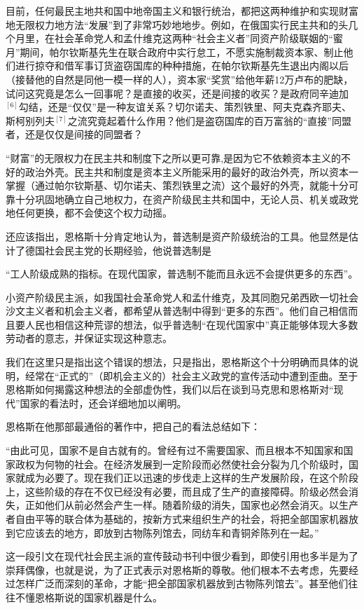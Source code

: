 \leftskip=0mm
\normalsize
\pskip

目前，任何最民主地共和国中地帝国主义和银行统治，都把这两种维护和实现财富地无限权力地方法“发展”到了非常巧妙地地步。例如，在俄国实行民主共和的头几个月里，在社会革命党人和孟什维克这两种“社会主义者”同资产阶级联姻的“蜜月”期间，帕尔钦斯基先生在联合政府中实行怠工，不愿实施制裁资本家、制止他们进行掠夺和借军事订货盗窃国库的种种措施，在帕尔钦斯基先生退出内阁以后（接替他的自然是同他一模一样的人），资本家“奖赏”给他年薪12万卢布的肥缺，试问这究竟是怎么一回事呢？是直接的收买，还是间接的收买？是政府同辛迪加$^{[6]}$勾结，还是“仅仅”是一种友谊关系？切尔诺夫、策烈铁里、阿夫克森齐耶夫、斯柯别列夫$^{[7]}$之流究竟起着什么作用？他们是盗窃国库的百万富翁的“直接”同盟者，还是仅仅是间接的同盟者？

“财富”的无限权力在民主共和制度下之所以更{\kaishu 可靠},是因为它不依赖资本主义的不好的政治外壳。民主共和制度是资本主义所能采用的最好的政治外壳，所以资本一掌握（通过帕尔钦斯基、切尔诺夫、策烈铁里之流）这个最好的外壳，就能十分可靠十分巩固地确立自己地权力，在资产阶级民主共和国中，无论人员、机关或政党地{\kaishu 任何}更换，都不会使这个权力动摇。

还应该指出，恩格斯十分肯定地认为，普选制是资产阶级统治的工具。他显然是估计了德国社会民主党的长期经验，他说普选制是
\pskip
\leftskip=10mm
\small

“工人阶级成熟的指标。在现代国家，普选制不能而且永远不会提供更多的东西”。

\leftskip=0mm
\normalsize
\pskip

小资产阶级民主派，如我国社会革命党人和孟什维克，及其同胞兄弟西欧一切社会沙文主义者和机会主义者，都希望从普选制中得到“更多的东西”。他们自己相信而且要人民也相信这种荒谬的想法，似乎普选制“在{\kaishu 现代}国家中”真正能够体现大多数劳动者的意志，并保证实现这种意志。

我们在这里只是指出这个错误的想法，只是指出，恩格斯这个十分明确而具体的说明，经常在“正式的”（即机会主义的）社会主义政党的宣传活动中遭到歪曲。至于恩格斯如何揭露这种想法的全部虚伪性，我们以后在谈到马克思和恩格斯对“{\kaishu 现代}”国家的看法时，还会详细地加以阐明。

恩格斯在他那部最通俗的著作中，把自己的看法总结如下：
\pskip
\leftskip=10mm
\small

“由此可见，国家不是自古就有的。曾经有过不需要国家、而且根本不知国家和国家政权为何物的社会。在经济发展到一定阶段而必然使社会分裂为几个阶级时，国家就成为必要了。现在我们正以迅速的步伐走上这样的生产发展阶段，在这个阶段上，这些阶级的存在不仅已经没有必要，而且成了生产的直接障碍。阶级必然会消失，正如他们从前必然会产生一样。随着阶级的消失，国家也必然会消灭。以生产者自由平等的联合体为基础的，按新方式来组织生产的社会，将把全部国家机器放到它应该去的地方，即放到古物陈列馆去，同纺车和青铜斧陈列在一起。”

\leftskip=0mm
\normalsize
\pskip

这一段引文在现代社会民主派的宣传鼓动书刊中很少看到，即使引用也多半是为了崇拜偶像，也就是说，为了正式表示对恩格斯的尊敬。他们根本不去考虑，先要经过怎样广泛而深刻的革命，才能“把全部国家机器放到古物陈列馆去”。甚至他们往往不懂恩格斯说的国家机器是什么。





